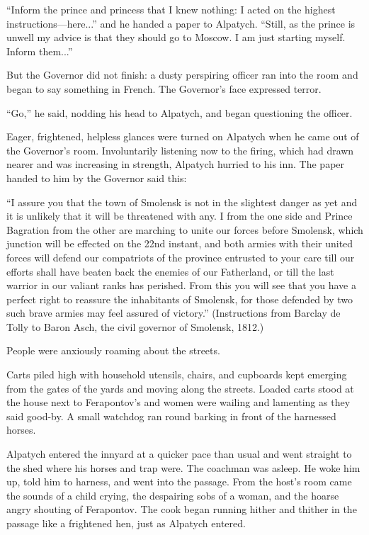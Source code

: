 ``Inform the prince and princess that I knew nothing: I acted on
the highest instructions---here...'' and he handed a paper to
Alpatych.  ``Still, as the prince is unwell my advice is that
they should go to Moscow. I am just starting myself. Inform
them...''

But the Governor did not finish: a dusty perspiring officer ran
into the room and began to say something in French. The
Governor's face expressed terror.

``Go,'' he said, nodding his head to Alpatych, and began
questioning the officer.

Eager, frightened, helpless glances were turned on Alpatych when
he came out of the Governor's room. Involuntarily listening now
to the firing, which had drawn nearer and was increasing in
strength, Alpatych hurried to his inn. The paper handed to him by
the Governor said this:

``I assure you that the town of Smolensk is not in the slightest
danger as yet and it is unlikely that it will be threatened with
any. I from the one side and Prince Bagration from the other are
marching to unite our forces before Smolensk, which junction will
be effected on the 22nd instant, and both armies with their
united forces will defend our compatriots of the province
entrusted to your care till our efforts shall have beaten back
the enemies of our Fatherland, or till the last warrior in our
valiant ranks has perished. From this you will see that you have
a perfect right to reassure the inhabitants of Smolensk, for
those defended by two such brave armies may feel assured of
victory.''  (Instructions from Barclay de Tolly to Baron Asch,
the civil governor of Smolensk, 1812.)

People were anxiously roaming about the streets.

Carts piled high with household utensils, chairs, and cupboards
kept emerging from the gates of the yards and moving along the
streets.  Loaded carts stood at the house next to Ferapontov's
and women were wailing and lamenting as they said good-by. A
small watchdog ran round barking in front of the harnessed
horses.

Alpatych entered the innyard at a quicker pace than usual and
went straight to the shed where his horses and trap were. The
coachman was asleep. He woke him up, told him to harness, and
went into the passage.  From the host's room came the sounds of a
child crying, the despairing sobs of a woman, and the hoarse
angry shouting of Ferapontov. The cook began running hither and
thither in the passage like a frightened hen, just as Alpatych
entered.

